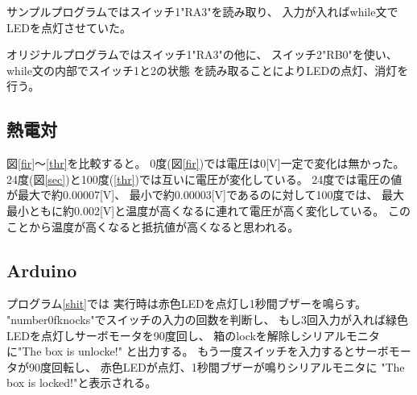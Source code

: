 \documentclass{jsarticle}
\begin{document}
サンプルプログラムではスイッチ1"RA3"を読み取り、
入力が入ればwhile文でLEDを点灯させていた。\par
オリジナルプログラムではスイッチ1"RA3"の他に、
スイッチ2"RB0"を使い、
while文の内部でスイッチ1と2の状態
を読み取ることによりLEDの点灯、消灯を行う。

\subsection{熱電対}
図\ref{fir}〜\ref{thr}を比較すると。
0度(図\ref{fir})では電圧は0[V]一定で変化は無かった。
24度(図\ref{sec})と100度(\ref{thr})では互いに電圧が変化している。
24度では電圧の値が最大で約0.00007[V]、
最小で約0.00003[V]であるのに対して100度では、
最大最小ともに約0.002[V]と温度が高くなるに連れて電圧が高く変化している。
このことから温度が高くなると抵抗値が高くなると思われる。

\subsection{Arduino}
プログラム\ref{shit}では
実行時は赤色LEDを点灯し1秒間ブザーを鳴らす。
"number0fknocks"でスイッチの入力の回数を判断し、
もし3回入力が入れば緑色LEDを点灯しサーボモータを90度回し、
箱のlockを解除しシリアルモニタに"The box is unlocke!"
と出力する。
もう一度スイッチを入力するとサーボモータが90度回転し、
赤色LEDが点灯、1秒間ブザーが鳴りシリアルモニタに
"The box is locked!"と表示される。

\end{document}
